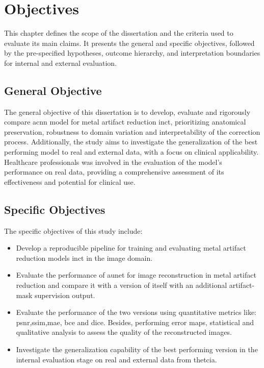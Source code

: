 \chapter{Objectives}
\label{chap:final-objectives}
This chapter defines the scope of the dissertation and the criteria used to evaluate its main claims. It presents the general and specific objectives, followed by the pre-specified hypotheses, outcome hierarchy, and interpretation boundaries for internal and external evaluation.

\section{General Objective}

The general objective of this dissertation is to develop, evaluate and rigorously compare a\acrshort{cnn} model for metal artifact reduction in\acrshort{ct}, prioritizing anatomical preservation, robustness to domain variation and interpretability of the correction process. Additionally, the study aims to investigate the generalization of the best performing model to real and external data, with a focus on clinical applicability. Healthcare professionals was involved in the evaluation of the model's performance on real data, providing a comprehensive assessment of its effectiveness and potential for clinical use.

\section{Specific Objectives}
The specific objectives of this study include:

\begin{itemize}
    \item Develop a reproducible pipeline for training and evaluating metal artifact reduction models in\acrshort{ct} in the image domain.

    \item Evaluate the performance of a\acrfull{unet} for image reconstruction in metal artifact reduction and compare it with a version of itself with an additional artifact-mask supervision output.
    \item Evaluate the performance of the two versions using quantitative metrics like: \acrfull{psnr},\acrfull{ssim},\acrfull{mae}, \acrfull{bce} and \acrfull{dice}. Besides, performing error maps, statistical and qualitative analysis to assess the quality of the reconstructed images.
    \item Investigate the generalization capability of the best performing version in the internal evaluation stage on real and external data from the\acrfull{tcia}.
\end{itemize}

